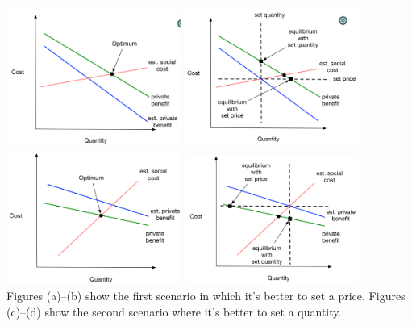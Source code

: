 \documentclass[12pt, final]{article}
\begin{document}
\begin{center}
	\includegraphics[width=2.25in]{fig1a.png}
	\includegraphics[width=2.25in]{fig1b.png} \\

	\includegraphics[width=2.25in]{fig1c.png}
	\includegraphics[width=2.25in]{fig1d.png} \\
Figures (a)--(b) show the first scenario in which it's better to set a price.  Figures (c)--(d) show the second scenario where it's better to set a quantity.
\label{fig:one}
\end{center}
\end{document}
